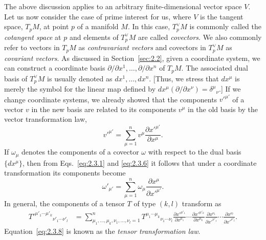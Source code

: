 The above discussion applies to an arbitrary finite-dimensional vector space \(V\).
Let us now consider the case of prime interest for us, where \(V\) is the tangent
space, \(T_pM\), at point \(p\) of a manifold \(M\).  In this case, \(T_p^\vee M\) is
commonly called the \emph{cotangent space} at \(p\) and elements of \(T_p^\vee M\) are
called \emph{covectors}.  We also commonly refer to vectors in \(T_pM\) as
\emph{contravariant vectors} and covectors in \(T_p^\vee M\) as \emph{covariant
vectors}.  As discussed in Section~\ref{sec:2.2}, given a coordinate system, we can
construct a coordinate basis \(\partial/\partial x^1,\ldots,\partial/\partial x^n\)
of \(T_pM\).  The associated dual basis of \(T_p^\vee M\) is usually denoted as
\(dx^1,\ldots,dx^n\).  [Thus, we stress that \(dx^\mu\) is merely the symbol for
the linear map defined by
\(dx^\mu(\partial/\partial x^\nu)=\delta^\mu{}_{\nu}\).]  If we change
coordinate systems, we already showed that the components \(v'^{\mu'}\) of a
vector \(v\) in the new basis are related to its components \(v^\mu\) in the old
basis by the vector transformation law,
\begin{equation}
  v'^{\mu'}=\sum_{\mu=1}^n
  v^\mu\frac{\partial x'^{\mu'}}{\partial x^\mu} .
  \tag{2.3.6}\label{eq:2.3.6}
\end{equation}
If \(\omega_\mu\) denotes the components of a covector \(\omega\) with respect to
the dual basis \(\{dx^\mu\}\), then from Eqs.~\eqref{eq:2.3.1} and
\eqref{eq:2.3.6} it follows that under a coordinate transformation its components
become
\begin{equation}
  \omega'_{\mu'}=\sum_{\mu=1}^n
  \omega_\mu\frac{\partial x^\mu}{\partial x'^{\mu'}} .
  \tag{2.3.7}\label{eq:2.3.7}
\end{equation}
In general, the components of a tensor \(T\) of type \((k,l)\) transform as
\begin{equation}
\begin{aligned}
  T'^{\mu'_1\cdots\mu'_k}{}_{\nu'_1\cdots\nu'_l}
  &={\sum}_{\mu_1,\ldots,\mu_k,\nu_1,\ldots,\nu_l=1}^n
  T^{\mu_1\cdots\mu_k}{}_{\nu_1\cdots\nu_l}
  \frac{\partial x'^{\mu'_1}}{\partial x^{\mu_1}}\cdots
  \frac{\partial x'^{\mu'_k}}{\partial x^{\mu_k}}
  \frac{\partial x^{\nu_1}}{\partial x'^{\nu'_1}}\cdots
  \frac{\partial x^{\nu_l}}{\partial x'^{\nu'_l}} .
\end{aligned}
\tag{2.3.8}\label{eq:2.3.8}
\end{equation}
Equation~\eqref{eq:2.3.8} is known as the \emph{tensor transformation law}.

